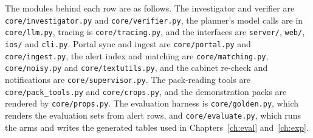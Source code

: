 \begin{sloppypar}The modules behind each row are as follows. The investigator and verifier are \texttt{core/investigator.py} and \texttt{core/verifier.py}, the planner's model calls are in \texttt{core/llm.py}, tracing is \texttt{core/tracing.py}, and the interfaces are \texttt{server/}, \texttt{web/}, \texttt{ios/} and \texttt{cli.py}. Portal sync and ingest are \texttt{core/portal.py} and \texttt{core/ingest.py}, the alert index and matching are \texttt{core/matching.py}, \texttt{core/noisy.py} and \texttt{core/textutils.py}, and the cabinet re-check and notifications are \texttt{core/supervisor.py}. The pack-reading tools are \texttt{core/pack\_tools.py} and \texttt{core/crops.py}, and the demonstration packs are rendered by \texttt{core/props.py}. The evaluation harness is \texttt{core/golden.py}, which renders the evaluation sets from alert rows, and \texttt{core/evaluate.py}, which runs the arms and writes the generated tables used in Chapters~\ref{ch:eval} and~\ref{ch:exp}.\end{sloppypar}
